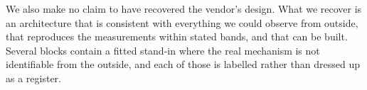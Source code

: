 We also make no claim to have recovered the vendor's design. What we recover is
an architecture that is consistent with everything we could observe from
outside, that reproduces the measurements within stated bands, and that can be
built. Several blocks contain a fitted stand-in where the real mechanism is not
identifiable from the outside, and each of those is labelled \evcal{} rather than
dressed up as a register.
